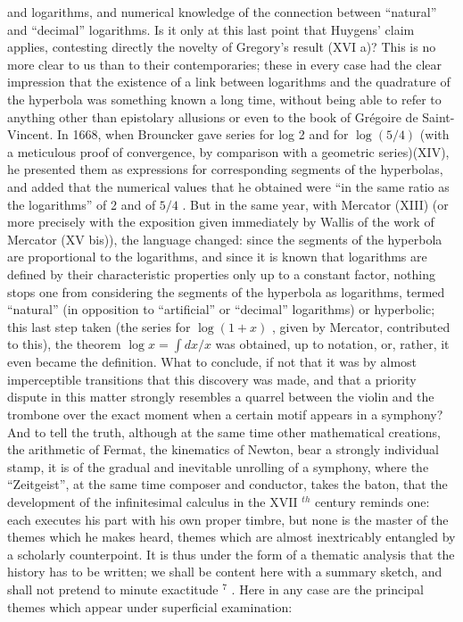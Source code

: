 and logarithms, and numerical knowledge of the connection between ``natural'' and ``decimal'' logarithms. Is it only at this last point that Huygens' claim applies, contesting directly the novelty of Gregory's result (XVI a)? This is no more clear to us than to their contemporaries; these in every case had the clear impression that the existence of a link between logarithms and the quadrature of the hyperbola was something known a long time, without being able to refer to anything other than epistolary allusions or even to the book of Grégoire de Saint-Vincent. In 1668, when Brouncker gave series for log 2 and for \(\log(5/4)\) (with a meticulous proof of convergence, by comparison with a geometric series)(XIV), he presented them as expressions for corresponding segments of the hyperbolas, and added that the numerical values that he obtained were ``in the same ratio as the logarithms'' of 2 and of \(5/4\) . But in the same year, with Mercator (XIII) (or more precisely with the exposition given immediately by Wallis of the work of Mercator (XV bis)), the language changed: since the segments of the hyperbola are proportional to the logarithms, and since it is known that logarithms are defined by their characteristic properties only up to a constant factor, nothing stops one from considering the segments of the hyperbola as logarithms, termed ``natural'' (in opposition to ``artificial'' or ``decimal'' logarithms) or hyperbolic; this last step taken (the series for \(\log(1 + x)\) , given by Mercator, contributed to this), the theorem \(\log x = \int dx / x\) was obtained, up to notation, or, rather, it even became the definition. What to conclude, if not that it was by almost imperceptible transitions that this discovery was made, and that a priority dispute in this matter strongly resembles a quarrel between the violin and the trombone over the exact moment when a certain motif appears in a symphony? And to tell the truth, although at the same time other mathematical creations, the arithmetic of Fermat, the kinematics of Newton, bear a strongly individual stamp, it is of the gradual and inevitable unrolling of a symphony, where the ``Zeitgeist'', at the same time composer and conductor, takes the baton, that the development of the infinitesimal calculus in the XVII \(^{th}\) century reminds one: each executes his part with his own proper timbre, but none is the master of the themes which he makes heard, themes which are almost inextricably entangled by a scholarly counterpoint. It is thus under the form of a thematic analysis that the history has to be written; we shall be content here with a summary sketch, and shall not pretend to minute exactitude \(^{7}\) . Here in any case are the principal themes which appear under superficial examination:

